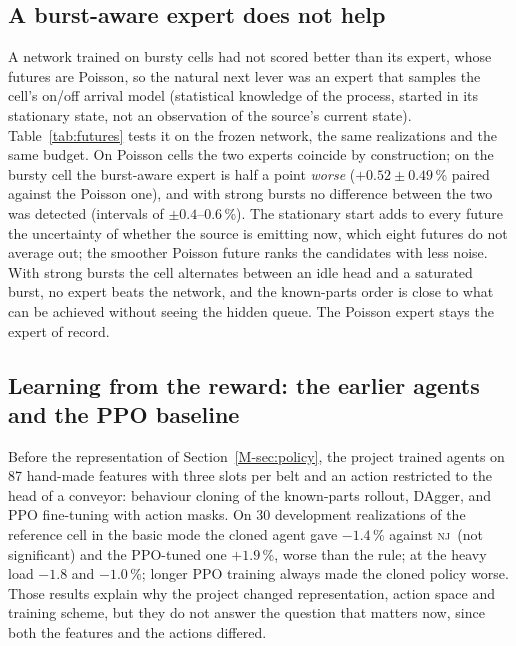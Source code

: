 \documentclass[11pt,a4paper]{article}
\theoremstyle{plain}
\theoremstyle{definition}
\theoremstyle{remark}
\newcommand{\nj}{\textsc{nj}}
\begin{document}
\subsection{A burst-aware expert does not help}\label{sec:futures}
A network trained on bursty cells had not scored better than its expert, whose futures
are Poisson, so the natural next lever was an expert that samples the cell's on/off arrival model
(statistical knowledge of the process, started in its stationary state, not an
observation of the source's current state). Table~\ref{tab:futures} tests it on the
frozen network, the same realizations and the same budget. On Poisson cells the two
experts coincide by construction; on the bursty cell the burst-aware expert is half a
point \emph{worse} ($+0.52\pm0.49$\,\% paired against the Poisson one), and with strong
bursts no difference between the two was detected (intervals of $\pm0.4$--$0.6$\,\%). The stationary start adds to
every future the uncertainty of whether the source is emitting now, which eight futures
do not average out; the smoother Poisson future ranks the candidates with less noise. With
strong bursts the cell alternates between an idle head and a saturated burst, no expert
beats the network, and the known-parts order is close to what can be achieved without
seeing the hidden queue. The Poisson expert stays the expert of record.

\begin{table}[t]
\centering\small
\caption{Expert futures: the frozen network alone, and the scenario search over it with
Poisson futures and with the cell's on/off arrival model, on the validation groups
(design mode, 50 realizations per group, 100 general) and on two cells with strong
bursts (on 20\,\% of the time in 40~s periods). Paired $\Delta$ vs \nj\ [\%, 95\,\% CI]. Legacy tie-break.}
\label{tab:futures}
\resizebox{\linewidth}{!}{}
\end{table}

\subsection{Learning from the reward: the earlier agents and the PPO baseline}\label{sec:rlhistory}
Before the representation of Section~\ref{M-sec:policy}, the project trained agents on 87
hand-made features with three slots per belt and an action restricted to the head of a
conveyor: behaviour cloning of the known-parts rollout, DAgger, and PPO fine-tuning with
action masks. On 30 development realizations of the reference cell in the basic mode the
cloned agent gave $-1.4$\,\% against \nj\ (not significant) and the PPO-tuned one
$+1.9$\,\%, worse than the rule; at the heavy load $-1.8$ and $-1.0$\,\%; longer PPO
training always made the cloned policy worse. Those results explain why the project
changed representation, action space and training scheme, but they do not answer the
question that matters now, since both the features and the actions differed.
\end{document}
